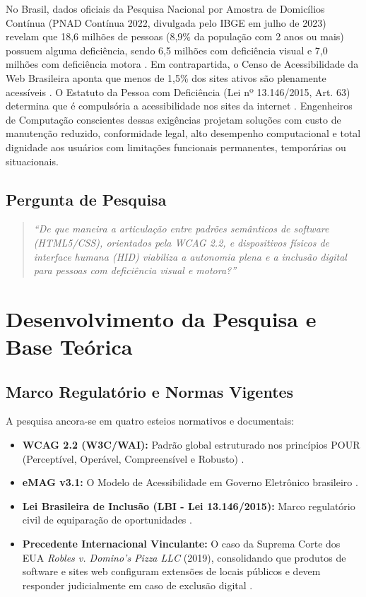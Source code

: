\documentclass[12pt,a4paper]{article}
\begin{document}
No Brasil, dados oficiais da Pesquisa Nacional por Amostra de Domicílios Contínua (PNAD Contínua 2022, divulgada pelo IBGE em julho de 2023) revelam que 18,6 milhões de pessoas (8,9\% da população com 2 anos ou mais) possuem alguma deficiência, sendo 6,5 milhões com deficiência visual e 7,0 milhões com deficiência motora \cite{ibge_pnad2022}. Em contrapartida, o Censo de Acessibilidade da Web Brasileira aponta que menos de 1,5\% dos sites ativos são plenamente acessíveis \cite{censo_mwpt2023}. O Estatuto da Pessoa com Deficiência (Lei nº 13.146/2015, Art. 63) determina que é compulsória a acessibilidade nos sites da internet \cite{lbi_lei13146}. Engenheiros de Computação conscientes dessas exigências projetam soluções com custo de manutenção reduzido, conformidade legal, alto desempenho computacional e total dignidade aos usuários com limitações funcionais permanentes, temporárias ou situacionais.

\subsection{Pergunta de Pesquisa}
\begin{quote}
\textit{“De que maneira a articulação entre padrões semânticos de software (HTML5/CSS), orientados pela WCAG 2.2, e dispositivos físicos de interface humana (HID) viabiliza a autonomia plena e a inclusão digital para pessoas com deficiência visual e motora?”}
\end{quote}

\section{Desenvolvimento da Pesquisa e Base Teórica}

\subsection{Marco Regulatório e Normas Vigentes}
A pesquisa ancora-se em quatro esteios normativos e documentais:
\begin{itemize}
    \item \textbf{WCAG 2.2 (W3C/WAI):} Padrão global estruturado nos princípios POUR (Perceptível, Operável, Compreensível e Robusto) \cite{w3c_wcag22}.
    \item \textbf{eMAG v3.1:} O Modelo de Acessibilidade em Governo Eletrônico brasileiro \cite{emag_brasil}.
    \item \textbf{Lei Brasileira de Inclusão (LBI - Lei 13.146/2015):} Marco regulatório civil de equiparação de oportunidades \cite{lbi_lei13146}.
    \item \textbf{Precedente Internacional Vinculante:} O caso da Suprema Corte dos EUA \textit{Robles v. Domino's Pizza LLC} (2019), consolidando que produtos de software e sites web configuram extensões de locais públicos e devem responder judicialmente em caso de exclusão digital \cite{robles_dominos2019}.
\end{itemize}
\end{document}
